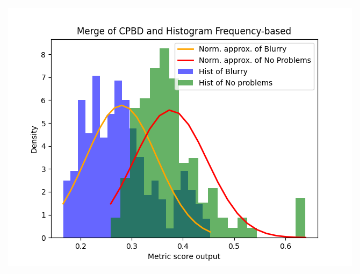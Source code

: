 \begin{figure}[H]
\begin{subfigure}[t]{0.48\textwidth}
        \caption{}
        \label{fig:CPBD_HF_thresh}
    \end{subfigure}\hspace{1em}
    \begin{subfigure}[t]{0.48\textwidth}
        \includegraphics[width=\textwidth]{Figures/BlurredImages/results_on_thresholds/output_dens_cpbd_hf.png}
        \caption{}
        \label{fig:CPBD_HF_dens}
    \end{subfigure}\hspace{1em}
    \caption{}
    \label{fig:CPBD_HF_final}
\end{figure}

